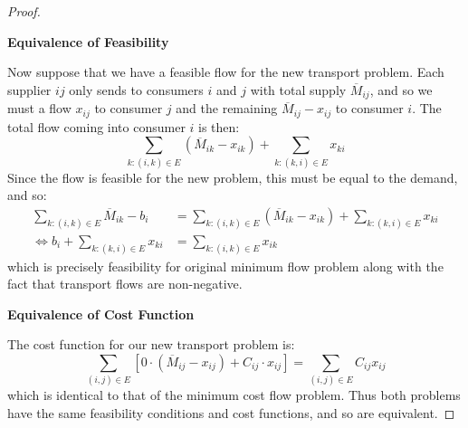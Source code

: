\documentclass[../main.tex]{subfiles}
\begin{document}
\begin{proof}
\begin{center}
  \end{center}

  \textbf{Equivalence of Feasibility}\par
  Now suppose that we have a feasible flow for the new transport problem.
  Each supplier $ij$ only sends to consumers $i$ and $j$ with total supply $\overline{M}_{i j}$, and so we must a flow $x_{i j}$ to consumer $j$ and the remaining $\overline{M}_{i j} - x_{i j}$ to consumer $i$.
  The total flow coming into consumer $i$ is then:
  \[
    \sum_{k: (i, k) \in E} (\overline{M}_{i k} - x_{i k}) + \sum_{k: (k, i) \in E} x_{k i}
  \]
  Since the flow is feasible for the new problem, this must be equal to the demand, and so:
  \begin{align*}
    \sum_{k: (i, k) \in E} \overline{M}_{i k} - b_i &= \sum_{k: (i, k) \in E} (\overline{M}_{i k} - x_{i k}) + \sum_{k: (k, i) \in E} x_{k i} \\
    \iff b_i + \sum_{k: (k, i) \in E} x_{k i} &= \sum_{k: (i, k) \in E} x_{i k}
  \end{align*}
  which is precisely feasibility for original minimum flow problem along with the fact that transport flows are non-negative.

  \textbf{Equivalence of Cost Function}\par
  The cost function for our new transport problem is:
  \[
    \sum_{(i, j) \in E} \left[0 \cdot (\overline{M}_{i j} - x_{i j}) + C_{i j} \cdot x_{i j}\right] = \sum_{(i, j) \in E} C_{i j} x_{i j}
  \]
  which is identical to that of the minimum cost flow problem.
  Thus both problems have the same feasibility conditions and cost functions, and so are equivalent.
\end{proof}
\end{document}
